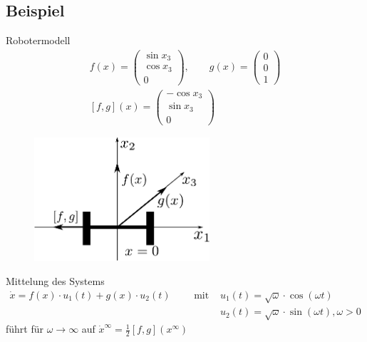 \documentclass[ngerman]{tudscrreprt}
\begin{document}
\subsection*{Beispiel}
Robotermodell
\begin{align*}
f(x) = \begin{pmatrix} \sin{x_3} \\ \cos{x_3}\\ 0 \end{pmatrix}, \qquad g(x) = \begin{pmatrix} 0\\ 0\\ 1\end{pmatrix} \\ 
[f,g](x) = \begin{pmatrix} -\cos{x_3}\\ \sin{x_3}\\ 0 \end{pmatrix}
\end{align*}
\begin{figure}[H]
\centering
\def\svgwidth{200pt} 
  \includegraphics[width=6.5cm]{images/robmod1.pdf}
\end{figure}
Mittelung des Systems 
\begin{align*}
\dot x = f(x)\cdot u_1(t) + g(x)\cdot u_2(t) \qquad \text{ mit } &u_1(t)= \sqrt{\omega}\cdot \cos{(\omega t)}\\ 
&u_2(t) = \sqrt{\omega}\cdot \sin{(\omega t)}, \omega > 0
\end{align*}
führt für $\omega \to \infty$ auf $\dot x^\infty = \frac{1}{2} [f,g] (x^\infty)$
\end{document}
